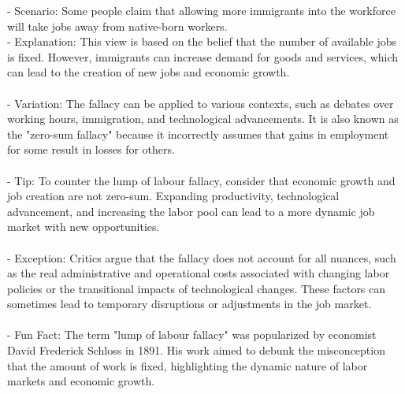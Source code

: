\documentclass[a4paper,12pt,single,pdftex]{scrartcl}
\begin{document}
    
        - Scenario: Some people claim that allowing more immigrants into the workforce will take jobs away from native-born workers.
    \\

    
        - Explanation: This view is based on the belief that the number of available jobs is fixed. However, immigrants can increase demand for goods and services, which can lead to the creation of new jobs and economic growth.
    \\

    
      
    \\

    
      - Variation: The fallacy can be applied to various contexts, such as debates over working hours, immigration, and technological advancements. It is also known as the "zero-sum fallacy" because it incorrectly assumes that gains in employment for some result in losses for others.
    \\

    
      
    \\

    
      - Tip: To counter the lump of labour fallacy, consider that economic growth and job creation are not zero-sum. Expanding productivity, technological advancement, and increasing the labor pool can lead to a more dynamic job market with new opportunities.
    \\

    
      
    \\

    
      - Exception: Critics argue that the fallacy does not account for all nuances, such as the real administrative and operational costs associated with changing labor policies or the transitional impacts of technological changes. These factors can sometimes lead to temporary disruptions or adjustments in the job market.
    \\

    
      
    \\

    
      - Fun Fact: The term "lump of labour fallacy" was popularized by economist David Frederick Schloss in 1891. His work aimed to debunk the misconception that the amount of work is fixed, highlighting the dynamic nature of labor markets and economic growth.
    \\
\end{document}

